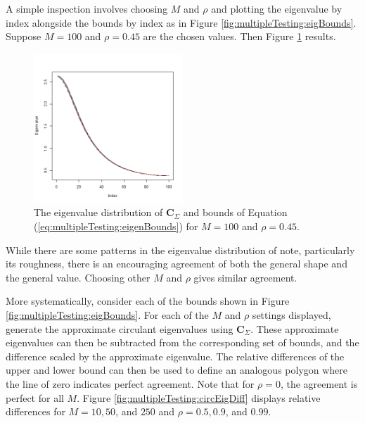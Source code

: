 \documentclass[letterpaper,12pt,oneside,final]{article}
\newcommand{\m}[1]{\mathbf{#1}}               %
\begin{document}
A simple inspection involves choosing $M$ and $\rho$ and plotting the eigenvalue by index alongside the bounds by index as in Figure \ref{fig:multipleTesting:eigBounds}. Suppose $M = 100$ and $\rho = 0.45$ are the chosen values. Then Figure \ref{fig:multipleTesting:circEigenComp} results.
\begin{figure}[htp]
\begin{center}
\includegraphics[width = 0.5\textwidth]{./img/m100r5eigsbnds.png}
\end{center}
\caption{The eigenvalue distribution of $\m{C}_{\Sigma}$ and bounds of Equation (\ref{eq:multipleTesting:eigenBounds}) for $M = 100$ and $\rho = 0.45$.}
\label{fig:multipleTesting:circEigenComp}
\end{figure}
While there are some patterns in the eigenvalue distribution of note, particularly its roughness, there is an encouraging agreement of both the general shape and the general value. Choosing other $M$ and $\rho$ gives similar agreement.

More systematically, consider each of the bounds shown in Figure \ref{fig:multipleTesting:eigBounds}. For each of the $M$ and $\rho$ settings displayed, generate the approximate circulant eigenvalues using $\m{C}_{\Sigma}$. These approximate eigenvalues can then be subtracted from the corresponding set of bounds, and the difference scaled by the approximate eigenvalue. The relative differences of the upper and lower bound can then be used to define an analogous polygon where the line of zero indicates perfect agreement. Note that for $\rho = 0$, the agreement is perfect for all $M$. Figure \ref{fig:multipleTesting:circEigDiff} displays relative differences for $M=10, 50$, and $250$ and $\rho = 0.5,0.9$, and $0.99$.
\end{document}
